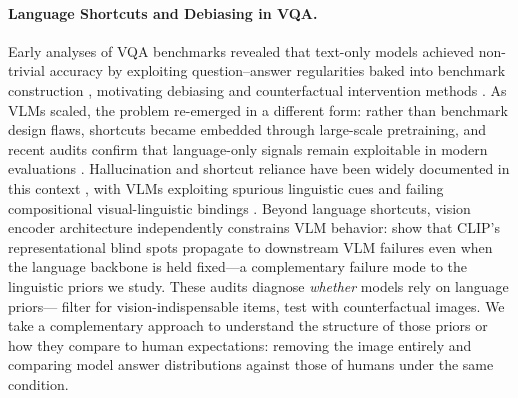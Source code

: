 \documentclass[letterpaper]{article}
\begin{document}
\paragraph{Language Shortcuts and Debiasing in VQA.}
Early analyses of VQA benchmarks revealed that text-only models achieved
non-trivial accuracy by exploiting question--answer regularities baked into
benchmark construction \citep{jabri2016revisiting,zhang2016yin,agrawal2018dont},
motivating debiasing and counterfactual intervention methods
\citep{cadene2019rubi,clark2019dont,teney2020learning,niu2021counterfactual}. As VLMs scaled, the problem re-emerged in a
different form: rather than benchmark design flaws, shortcuts became embedded
through large-scale pretraining, and recent audits confirm that language-only
signals remain exploitable in modern evaluations \citep{chen2024are,lee2024vlind}.
Hallucination and shortcut reliance have been widely documented in this context
\citep{ji2023survey,rohrbach2018object,xiao2021hallucination}, with VLMs
exploiting spurious linguistic cues \citep{han2024instinctive,ye2024mmspubench}
and failing compositional visual-linguistic bindings \citep{yuksekgonul2023when}.
Beyond language shortcuts, vision encoder architecture independently constrains VLM behavior: \citet{tong2024eyes} show that CLIP's representational blind spots propagate to downstream VLM failures even when the language backbone is held fixed---a complementary failure mode to the linguistic priors we study.
These audits diagnose \emph{whether} models rely on language priors---\citet{chen2024are}
filter for vision-indispensable items, \citet{lee2024vlind} test with counterfactual
images. We take a complementary approach to understand the structure of those priors or how they compare to human expectations: removing the image
entirely and comparing model answer distributions against those of humans under the same condition.
\end{document}
